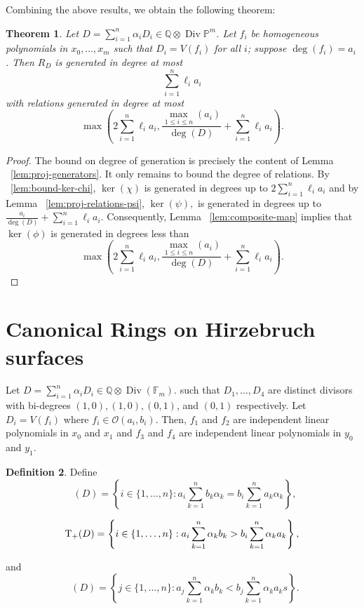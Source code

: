 \documentclass{amsart}
\theoremstyle{plain}
\newtheorem{thm}{Theorem}[section]
\theoremstyle{definition}
\newtheorem{defn}[thm]{Definition}
\theoremstyle{remark}
\numberwithin{equation}{section}
\newcommand\bq{{\mathbb Q}}
\newcommand\bp{{\mathbb P}}
\newcommand\sco{{\mathscr O}}
\DeclareMathOperator\di{Div}
\newcommand\bida{a}
\newcommand\bidb{b}
\newcommand\hirz{\mathbb{F}}
\DeclareMathOperator{\Te}{T_=}
\DeclareMathOperator{\Tp}{T_+}
\DeclareMathOperator{\Tm}{T_-}
\begin{document}
Combining the above results, we obtain the following theorem:

\begin{thm}
\label{lem:proj-generators-relations}
Let $D = \sum_{i=1}^n \alpha_i D_i \in \bq \otimes \di \bp^m$. Let $f_i$ be homogeneous polynomials in $x_0, \ldots, x_m$ such that $D_i = V(f_i)$ for all $i$; suppose $\deg(f_i) = a_i$. 
Then $R_D$ is generated in degree at most 
\[
	\sum_{i=1}^n \ell_i a_i
\]
with relations generated in degree at most
\[
	\max \left(2 \sum_{i=1}^n \ell_i a_i, \frac{\max_{1\le i \le n}(\bida_i)}{\deg(D)} + \sum_{i=1}^n \ell_i a_i \right).
\]
\end{thm}
\begin{proof}
The bound on degree of generation is precisely the content of Lemma ~\ref{lem:proj-generators}. It only remains to bound the degree of relations.
By ~\ref{lem:bound-ker-chi}, $\ker(\chi)$ is generated in degrees up to $2\sum_{i=1}^n \ell_i a_i$ and by Lemma ~\ref{lem:proj-relations-psi}, $\ker(\psi),$ is generated in degrees up to $\frac{\bida_i}{\deg(D)} + \sum_{i=1}^n \ell_i a_i.$ Consequently, Lemma ~\ref{lem:composite-map} implies that $\ker(\phi)$ is generated in degrees less than
\[
	\max \left(2 \sum_{i=1}^n \ell_i a_i, \frac{\max_{1\le i \le n}(\bida_i)}{\deg(D)} + \sum_{i=1}^n \ell_i a_i \right).
\]
\end{proof}

\section{Canonical Rings on Hirzebruch surfaces}
Let $D=\sum_{i=1}^n \alpha_i D_i \in \mathbb{Q} \otimes \di(\hirz_
m).$ such
that $D_1, \ldots, D_4$ are distinct divisors with bi-degrees $(1,0)
, (1,0), (0,1)$, and $(0,1)$ respectively. Let $D_i = V(f_i)$ where
$f_i \in \sco(\bida_i, \bidb_i)$.  
Then, $f_1$ and $f_2$ are independent linear
polynomials in $x_0$ and $x_1$ and $f_3$ and $f_4$ are independent
linear polynomials in $y_0$ and $y_1$. 

\begin{defn}
Define 
\begin{equation}
\label{eqn:define-T=(D)}
	\Te(D) = \left\{i \in \{1, \ldots, n\}: \bida_i \sum_{k=1}^n \bidb_k 
\alpha_k = \bidb_i \sum_{k=1}^n \bida_k \alpha_k \right\},
\end{equation}

\begin{equation}
\label{eqn:define-T+(D)}
	\Tp(D) = \left\{ i \in \{1, \ldots, n\}:  \vphantom{\sum_{k = 1}^n} 
	\bida_i \sum_{k = 1}^n \alpha_k \bidb_k > \bidb_i \sum_{k = 1}^n \alpha_k \bida_k 
\right\},
\end{equation}

\noindent
and
\begin{equation}
\label{eqn:define-T-(D)}
	\Tm(D) = \left\{ j \in \{1, \ldots, n\}: \bida_j \sum_{k = 1}^n \alpha_k
	\bidb_k < \bidb_j \sum_{k=1}^n \alpha_k \bida_k s \right\}.
\end{equation}
\end{defn}
\end{document}
